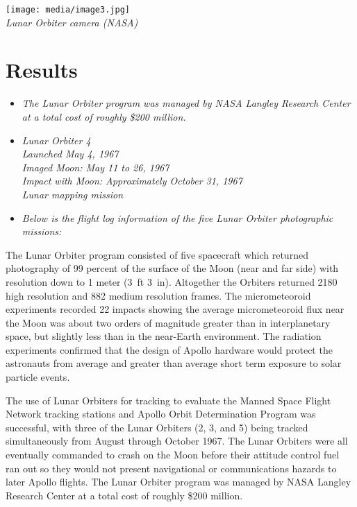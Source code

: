\texttt{[image: media/image3.jpg]}\\
\emph{Lunar Orbiter camera (NASA)}

\section{Results}\label{results}

\begin{itemize}
\item
  \emph{The Lunar Orbiter program was managed by NASA Langley Research
  Center at a total cost of roughly \$200 million.}
\item
  \emph{Lunar Orbiter 4\\
  Launched May 4, 1967\\
  Imaged Moon: May 11 to 26, 1967\\
  Impact with Moon: Approximately October 31, 1967\\
  Lunar mapping mission}
\item
  \emph{Below is the flight log information of the five Lunar Orbiter
  photographic missions:}
\end{itemize}

The Lunar Orbiter program consisted of five spacecraft which returned
photography of 99 percent of the surface of the Moon (near and far side)
with resolution down to 1 meter (3~ft 3~in). Altogether the Orbiters
returned 2180 high resolution and 882 medium resolution frames. The
micrometeoroid experiments recorded 22 impacts showing the average
micrometeoroid flux near the Moon was about two orders of magnitude
greater than in interplanetary space, but slightly less than in the
near-Earth environment. The radiation experiments confirmed that the
design of Apollo hardware would protect the astronauts from average and
greater than average short term exposure to solar particle events.

The use of Lunar Orbiters for tracking to evaluate the Manned Space
Flight Network tracking stations and Apollo Orbit Determination Program
was successful, with three of the Lunar Orbiters (2, 3, and 5) being
tracked simultaneously from August through October 1967. The Lunar
Orbiters were all eventually commanded to crash on the Moon before their
attitude control fuel ran out so they would not present navigational or
communications hazards to later Apollo flights. The Lunar Orbiter
program was managed by NASA Langley Research Center at a total cost of
roughly \$200 million.

